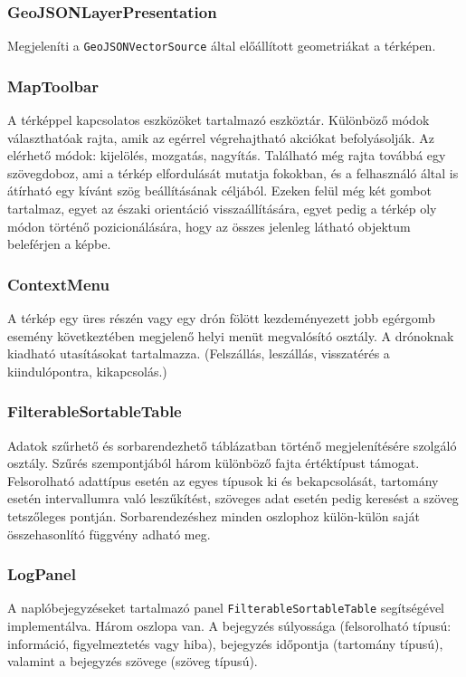 \subsubsection{GeoJSONLayerPresentation}
Megjeleníti a \verb|GeoJSONVectorSource| által előállított geometriákat a
térképen.

\subsubsection{MapToolbar}
A térképpel kapcsolatos eszközöket tartalmazó eszköztár. Különböző módok
választhatóak rajta, amik az egérrel végrehajtható akciókat befolyásolják. Az
elérhető módok: kijelölés, mozgatás, nagyítás. Található még rajta továbbá egy
szövegdoboz, ami a térkép elfordulását mutatja fokokban, és a felhasználó által
is átírható egy kívánt szög beállításának céljából. Ezeken felül még két gombot
tartalmaz, egyet az északi orientáció visszaállítására, egyet pedig a térkép oly
módon történő pozicionálására, hogy az összes jelenleg látható objektum
beleférjen a képbe.

\subsubsection{ContextMenu}
A térkép egy üres részén vagy egy drón fölött kezdeményezett jobb egérgomb
esemény következtében megjelenő helyi menüt megvalósító osztály. A drónoknak
kiadható utasításokat tartalmazza. (Felszállás, leszállás, visszatérés a
kiindulópontra, kikapcsolás.)

\subsubsection{FilterableSortableTable}
Adatok szűrhető és sorbarendezhető táblázatban történő megjelenítésére szolgáló
osztály. Szűrés szempontjából három különböző fajta értéktípust támogat.
Felsorolható adattípus esetén az egyes típusok ki és bekapcsolását, tartomány
esetén intervallumra való leszűkítést, szöveges adat esetén pedig keresést a
szöveg tetszőleges pontján. Sorbarendezéshez minden oszlophoz külön-külön saját
összehasonlító függvény adható meg.

\subsubsection{LogPanel}

A naplóbejegyzéseket tartalmazó panel \verb|FilterableSortableTable|
segítségével implementálva. Három oszlopa van. A bejegyzés súlyossága
(felsorolható típusú: információ, figyelmeztetés vagy hiba), bejegyzés időpontja
(tartomány típusú), valamint a bejegyzés szövege (szöveg típusú).

